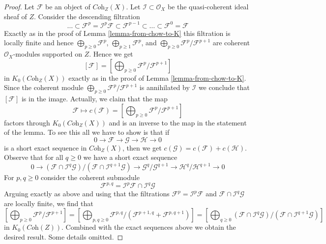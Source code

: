 \documentclass[10pt,a4paper]{amsart}
\theoremstyle{plain}
\theoremstyle{definition}
\theoremstyle{remark}
\numberwithin{equation}{subsection}
\begin{document}
\begin{proof}
Let $\mathcal{F}$ be an object of $\textit{Coh}_Z(X)$.
Let $\mathcal{I} \subset \mathcal{O}_X$ be the quasi-coherent
ideal sheaf of $Z$. Consider the descending filtration
$$
\ldots \subset
\mathcal{F}^p = \mathcal{I}^p \mathcal{F} \subset
\mathcal{F}^{p - 1} \subset \ldots \subset \mathcal{F}^0 = \mathcal{F}
$$
Exactly as in the proof of Lemma \ref{lemma-from-chow-to-K} this filtration
is locally finite and hence
$\bigoplus_{p \geq 0} \mathcal{F}^p$,
$\bigoplus_{p \geq 1} \mathcal{F}^p$, and
$\bigoplus_{p \geq 0} \mathcal{F}^p/\mathcal{F}^{p + 1}$
are coherent $\mathcal{O}_X$-modules supported on $Z$.
Hence we get
$$
[\mathcal{F}] =
[\bigoplus\nolimits_{p \geq 0} \mathcal{F}^p/\mathcal{F}^{p + 1}]
$$
in $K_0(\textit{Coh}_Z(X))$ exactly as in the proof of
Lemma \ref{lemma-from-chow-to-K}. Since the coherent module
$\bigoplus_{p \geq 0} \mathcal{F}^p/\mathcal{F}^{p + 1}$
is annihilated by $\mathcal{I}$ we conclude that
$[\mathcal{F}]$ is in the image. Actually, we claim that the map
$$
\mathcal{F} \longmapsto 
c(\mathcal{F}) =
[\bigoplus\nolimits_{p \geq 0} \mathcal{F}^p/\mathcal{F}^{p + 1}]
$$
factors through $K_0(\textit{Coh}_Z(X))$ and is an inverse to
the map in the statement of the lemma. To see this all we have
to show is that if
$$
0 \to \mathcal{F} \to \mathcal{G} \to \mathcal{H} \to 0
$$
is a short exact sequence in $\textit{Coh}_Z(X)$, then we
get $c(\mathcal{G}) = c(\mathcal{F}) + c(\mathcal{H})$.
Observe that for all $q \geq 0$ we have a short exact sequence
$$
0 \to
(\mathcal{F} \cap \mathcal{I}^q\mathcal{G})/
(\mathcal{F} \cap \mathcal{I}^{q + 1}\mathcal{G}) \to
\mathcal{G}^q/\mathcal{G}^{q + 1} \to
\mathcal{H}^q/\mathcal{H}^{q + 1} \to 0
$$
For $p, q \geq 0$ consider the coherent submodule
$$
\mathcal{F}^{p, q} = \mathcal{I}^p\mathcal{F} \cap \mathcal{I}^q\mathcal{G}
$$
Arguing exactly as above and using that the filtrations
$\mathcal{F}^p = \mathcal{I}^p\mathcal{F}$ and
$\mathcal{F} \cap \mathcal{I}^q\mathcal{G}$ are locally finite,
we find that
$$
[\bigoplus\nolimits_{p \geq 0} \mathcal{F}^p/\mathcal{F}^{p + 1}] =
[\bigoplus\nolimits_{p, q \geq 0}
\mathcal{F}^{p, q}/(\mathcal{F}^{p + 1, q} + \mathcal{F}^{p, q + 1})] =
[\bigoplus\nolimits_{q \geq 0}
(\mathcal{F} \cap \mathcal{I}^q\mathcal{G})/
(\mathcal{F} \cap \mathcal{I}^{q + 1}\mathcal{G})]
$$
in $K_0(\textit{Coh}(Z))$. Combined with the exact sequences above we obtain
the desired result. Some details omitted.
\end{proof}
\end{document}
